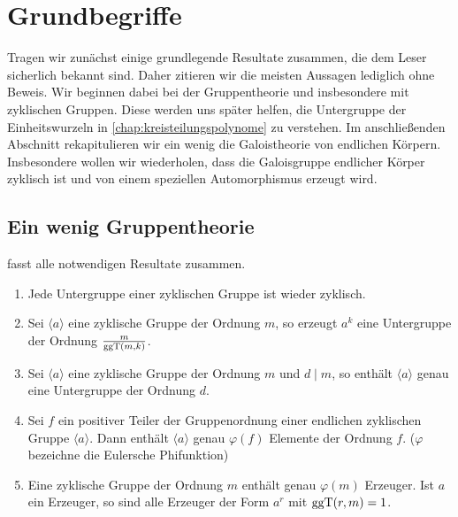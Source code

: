 \chapter{Grundbegriffe}
\label{chap:grundbegriffe}

Tragen wir zunächst 
einige grundlegende Resultate zusammen, die dem Leser sicherlich bekannt sind. 
Daher zitieren wir die meisten Aussagen 
lediglich ohne Beweis. Wir beginnen dabei bei der Gruppentheorie und
insbesondere mit zyklischen Gruppen. Diese werden uns später
helfen, die Untergruppe der Einheitswurzeln
in \autoref{chap:kreisteilungspolynome} zu verstehen. Im anschließenden Abschnitt
rekapitulieren wir ein wenig die Galoistheorie von endlichen Körpern.
Insbesondere wollen wir wiederholen, dass die 
Galoisgruppe endlicher Körper zyklisch ist und von einem
speziellen Automorphismus erzeugt wird.

\section{Ein wenig Gruppentheorie}


\autocite[Theorem 1.15]{lidl1997finite} fasst alle notwendigen Resultate
zusammen.

\begin{satz}
  \label{satz:zykl_gruppen}
  \begin{enumerate}
    \item Jede Untergruppe einer zyklischen Gruppe ist wieder zyklisch.
    \item Sei $\langle a \rangle$ eine zyklische Gruppe der Ordnung $m$,
      so erzeugt $a^k$ eine Untergruppe der Ordnung $\frac{m}{\operatorname{ggT}(m,k)}$.
    \item Sei $\langle a\rangle$ eine zyklische Gruppe der Ordnung $m$ und
      $d \mid m$, so enthält $\langle a \rangle$ genau eine Untergruppe der
      Ordnung $d$.
     \item Sei $f$ ein positiver Teiler der Gruppenordnung einer endlichen
        zyklischen Gruppe $\langle a \rangle$. Dann enthält $\langle a \rangle$
        genau $\varphi(f)$ Elemente der Ordnung $f$.
        ($\varphi$ bezeichne die Eulersche Phifunktion)
     \item Eine zyklische Gruppe der Ordnung $m$ enthält genau $\varphi(m)$
        Erzeuger. Ist $a$ ein Erzeuger, so sind alle Erzeuger der Form
        $a^r$ mit $\operatorname{ggT}(r,m) = 1$.
  \end{enumerate}
\end{satz}

